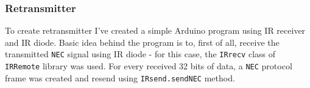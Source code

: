 \begin{figure}[!htb]
\end{figure}

\subsubsection{Retransmitter}

To create retransmitter I've created a simple Arduino program using IR receiver and IR diode. Basic idea behind the program is to, first of all, receive the transmitted \texttt{NEC} signal using IR diode - for this case, the \texttt{IRrecv} class of \texttt{IRRemote} library was used. For every received 32 bits of data, a \texttt{NEC} protocol frame was created and resend using \texttt{IRsend.sendNEC} method.
